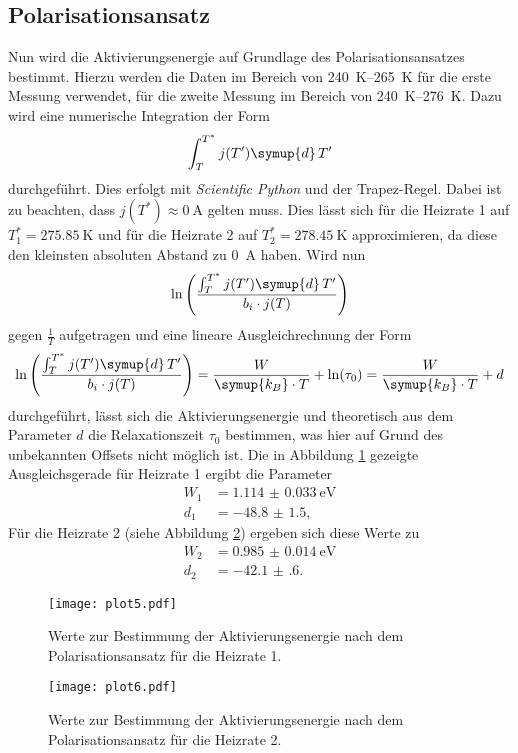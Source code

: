 \subsection{Polarisationsansatz}
\label{sec:grT}
Nun wird die Aktivierungsenergie auf Grundlage des Polarisationsansatzes bestimmt.
Hierzu werden die Daten im Bereich von \SIrange{240}{265}{\kelvin} für die erste Messung verwendet, für die zweite Messung im Bereich von \SIrange{240}{276}{\kelvin}.
Dazu wird eine numerische Integration der Form
\begin{equation}
    \label{eqn:int}
    \int_T^{T^*} j(T') \symup{d}\,T'
\end{equation}
durchgeführt.
Dies erfolgt mit \textit{Scientific Python} \cite{scipy} und der Trapez-Regel.
Dabei ist zu beachten, dass $j(T^*) \approx \SI{0}{\ampere}$ gelten muss.
Dies lässt sich für die Heizrate 1 auf $T^*_1 = \SI{275.85}{\kelvin}$ und für die Heizrate 2 auf $T^*_2 = \SI{278.45}{\kelvin}$ approximieren, da diese den kleinsten absoluten Abstand zu \SI{0}{\ampere} haben.
Wird nun
\begin{equation*}
    \ln\left(\frac{\int_T^{T^*} j(T') \symup{d}\,T'}{b_i \cdot j(T)}\right)
\end{equation*}
gegen $\frac{1}{T}$ aufgetragen und eine lineare Ausgleichrechnung der Form
\begin{equation}
    \label{eqn:lin2}
    \ln\left(\frac{\int_T^{T^*} j(T') \symup{d}\,T'}{b_i \cdot j(T)}\right) = \frac{W}{\symup{k_B} \cdot T} + \ln(\tau_0) = \frac{W}{\symup{k_B} \cdot T} + d
\end{equation}
durchgeführt, lässt sich die Aktivierungsenergie und theoretisch aus dem Parameter $d$ die Relaxationszeit $\tau_0$ bestimmen, was hier auf Grund des unbekannten Offsets nicht möglich ist.
Die in Abbildung \ref{fig:plot5} gezeigte Ausgleichsgerade für Heizrate 1 ergibt die Parameter
\begin{align*}
    W_1 &= \SI{1.114(33)}{\electronvolt} \\
    d_1 &= \num{-48.8(15)},
\end{align*}
Für die Heizrate 2 (siehe Abbildung \ref{fig:plot6}) ergeben sich diese Werte zu
\begin{align*}
    W_2 &= \SI{0.985(14)}{\electronvolt} \\
    d_2 &= \num{-42.1(6)}.
\end{align*}

\begin{figure}
  \centering
  \texttt{[image: plot5.pdf]}
  \caption{Werte zur Bestimmung der Aktivierungsenergie nach dem Polarisationsansatz für die Heizrate 1.}
  \label{fig:plot5}
\end{figure}
\begin{figure}
  \centering
  \texttt{[image: plot6.pdf]}
  \caption{Werte zur Bestimmung der Aktivierungsenergie nach dem Polarisationsansatz für die Heizrate 2.}
  \label{fig:plot6}
\end{figure}
\FloatBarrier


